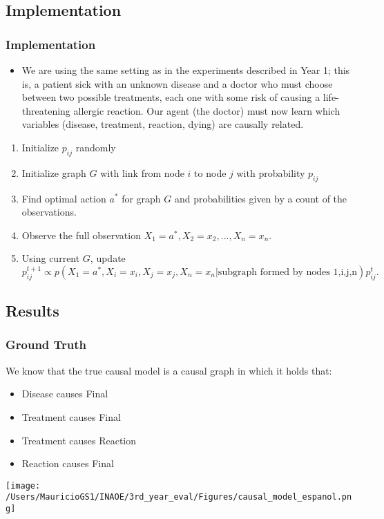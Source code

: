 \documentclass{beamer}
\theoremstyle{plain}
\begin{document}
\subsection{Implementation}
\begin{frame}
\frametitle{Implementation}
\begin{itemize}
\item We are using the same setting as in the experiments described in Year 1; this is, a patient sick with an unknown disease and a doctor who must choose between two possible treatments, each one with some risk of causing a life-threatening allergic reaction. Our agent (the doctor) must now learn which variables (disease, treatment, reaction, dying) are causally related.
\end{itemize}
\begin{enumerate}
\item Initialize $p_{ij}$ randomly
\item Initialize graph $G$ with link from node $i$ to node $j$ with probability $p_{ij}$
\item Find optimal action $a^\ast$ for graph $G$ and probabilities given by a count of the observations.
\item Observe the full observation $X_1 = a^\ast, X_2=x_2,...,X_n=x_n$. 
\item Using current $G$, update $p_{ij}^{t+1} \propto p(X_1 = a^\ast, X_i = x_i, X_j=x_j, X_n=x_n | \textrm{subgraph formed by nodes 1,i,j,n})p_{ij}^t.$
\end{enumerate}
\end{frame}

\subsection{Results}
\begin{frame}
\frametitle{Ground Truth}
We know that the true causal model is a causal graph in which it holds that:
\begin{itemize}
\item Disease causes Final
\item Treatment causes Final
\item Treatment causes Reaction
\item Reaction causes Final
\end{itemize}
\end{frame}

\begin{frame}
\texttt{[image: /Users/MauricioGS1/INAOE/3rd\_year\_eval/Figures/causal\_model\_espanol.png]}
\end{frame}
\end{document}
